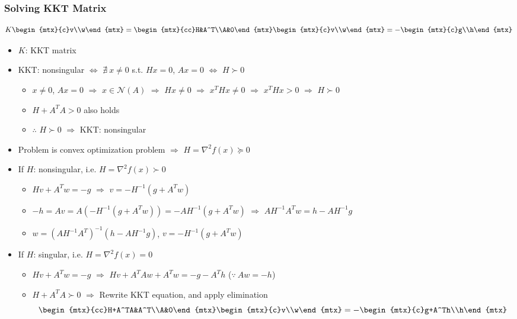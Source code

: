 \subsubsection*{Solving KKT Matrix}
$$ K\begin{mtx}{c}v\\w\end{mtx}=\begin{mtx}{cc}H&A^T\\A&0\end{mtx}\begin{mtx}{c}v\\w\end{mtx}=-\begin{mtx}{c}g\\h\end{mtx} $$
\begin{itemize}
    \item $K$: KKT matrix
    \item KKT: nonsingular $\Leftrightarrow$ $\nexists~x\neq 0$ s.t. $Hx=0$, $Ax=0$ $\Leftrightarrow$ $H\succ 0$
    \begin{itemize}
        \item $x\neq 0$, $Ax=0$ $\Rightarrow$ $x\in\mathcal{N}(A)$ $\Rightarrow$ $Hx\neq 0$ $\Rightarrow$ $x^THx\neq 0$ $\Rightarrow$ $x^THx>0$ $\Rightarrow$ $H\succ 0$
        \item $H+A^TA>0$ also holds
        \item $\therefore$ $H\succ 0$ $\Rightarrow$ KKT: nonsingular
    \end{itemize}
    \item Problem is convex optimization problem $\Rightarrow$ $H=\nabla^2 f(x)\succeq 0$
    \item If $H$: nonsingular, i.e. $H=\nabla^2 f(x)\succ 0$
    \begin{itemize}
        \item $Hv+A^Tw=-g$ $\Rightarrow$ $v=-H^{-1}(g+A^Tw)$
        \item $-h=Av=A\left(-H^{-1}(g+A^Tw)\right)=-AH^{-1}(g+A^Tw)$ $\Rightarrow$ $AH^{-1}A^Tw=h-AH^{-1}g$
        \item $w=\left(AH^{-1}A^T\right)^{-1}\left(h-AH^{-1}g\right)$, $v=-H^{-1}\left(g+A^Tw\right)$
    \end{itemize}
    \item If $H$: singular, i.e. $H=\nabla^2 f(x)=0$
    \begin{itemize}
        \item $Hv+A^Tw=-g$ $\Rightarrow$ $Hv+A^TAw+A^Tw=-g-A^Th$ ($\because~Aw=-h$)
        \item $H+A^TA\succ 0$ $\Rightarrow$ Rewrite KKT equation, and apply elimination
        $$ \begin{mtx}{cc}H+A^TA&A^T\\A&0\end{mtx}\begin{mtx}{c}v\\w\end{mtx}=-\begin{mtx}{c}g+A^Th\\h\end{mtx} $$
    \end{itemize}
\end{itemize}
